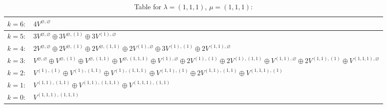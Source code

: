 \renewcommand{\arraystretch}{1.6} 
\begin{table}[H]
\centering
\caption{Table for $\lambda = (1, 1, 1)$, $\mu = (1, 1, 1)$:}
\begin{tabular}{|>{\centering\arraybackslash}p{15cm}|}
\hline
 $k = 6: \quad 4 V^{\varnothing, \varnothing} $ \\ \hline
 $k = 5: \quad 3 V^{\varnothing, \varnothing} \oplus 3 V^{\varnothing, (1)} \oplus 3 V^{(1), \varnothing} $ \\ \hline
 $k = 4: \quad 2 V^{\varnothing, \varnothing} \oplus 2 V^{\varnothing, (1)} \oplus 2 V^{\varnothing, (1, 1)} \oplus 2 V^{(1), \varnothing} \oplus 3 V^{(1), (1)} \oplus 2 V^{(1, 1), \varnothing} $ \\ \hline
 $k = 3: \quad V^{\varnothing, \varnothing} \oplus V^{\varnothing, (1)} \oplus V^{\varnothing, (1, 1)} \oplus V^{\varnothing, (1, 1, 1)} \oplus V^{(1), \varnothing} \oplus 2 V^{(1), (1)} \oplus 2 V^{(1), (1, 1)} \oplus V^{(1, 1), \varnothing} \oplus 2 V^{(1, 1), (1)} \oplus V^{(1, 1, 1), \varnothing} $ \\ \hline
 $k = 2: \quad V^{(1), (1)} \oplus V^{(1), (1, 1)} \oplus V^{(1), (1, 1, 1)} \oplus V^{(1, 1), (1)} \oplus 2 V^{(1, 1), (1, 1)} \oplus V^{(1, 1, 1), (1)} $ \\ \hline
 $k = 1: \quad V^{(1, 1), (1, 1)} \oplus V^{(1, 1), (1, 1, 1)} \oplus V^{(1, 1, 1), (1, 1)} $ \\ \hline
 $k = 0: \quad V^{(1, 1, 1), (1, 1, 1)} $ \\ \hline
\end{tabular}
\end{table}

